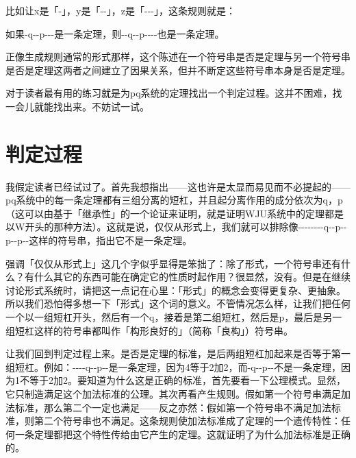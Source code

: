 \documentclass[
  12pt,
  twoside,
  openright,
  oldfontcommands,
]{memoir}
\begin{document}
比如让x是「-」，y是「-\/-」，z是「-\/-\/-」，这条规则就是：

如果-q-\/-p-\/-\/-是一条定理，则-\/-q-\/-p-\/-\/-\/-也是一条定理。

正像生成规则通常的形式那样，这个陈述在一个符号串是否是定理与另一个符号串是否是定理这两者之间建立了因果关系，但并不断定这些符号串本身是否是定理。

对于读者最有用的练习就是为pq系统的定理找出一个判定过程。这并不困难，找一会儿就能找出来。不妨试一试。

\section{判定过程}

我假定读者已经试过了。首先我想指出------这也许是太显而易见而不必提起的------pq系统中的每一条定理都有三组分离的短杠，并且起分离作用的成分依次为q，p（这可以由基于「继承性」的一个论证来证明，就是证明WJU系统中的定理都是以W开头的那种方法）。这就是说，仅仅从形式上，我们就可以排除像-\/-\/-\/-\/-\/-\/-\/-q-\/-p-\/-p-\/-p-\/-这样的符号串，指出它不是一条定理。

强调「仅仅从形式上」这几个字似乎显得是笨拙了：除了形式，一个符号串还有什么？有什么其它的东西可能在确定它的性质时起作用？很显然，没有。但是在继续讨论形式系统时，请把这一点记在心里：「形式」的概念会变得更复杂、更抽象。所以我们恐怕得多想一下「形式」这个词的意义。不管情况怎么样，让我们把任何一个以一组短杠开头，然后有一个q，接着是第二组短杠，然后是p，最后是另一组短杠这样的符号串都叫作「构形良好的」（简称「良构」）符号串。

让我们回到判定过程上来。是否是定理的标准，是后两组短杠加起来是否等于第一组短杠。例如：-\/-\/-\/-q-\/-p-\/-是一条定理，因为4等于2加2，而-q-\/-p-\/-不是一条定理，因为1不等于2加2。要知道为什么这是正确的标准，首先要看一下公理模式。显然，它只制造满足这个加法标准的公理。其次再看产生规则。假如第一个符号串满足加法标准，那么第二个一定也满足------反之亦然：假如第一个符号串不满足加法标准，则第二个符号串也不满足。这条规则使加法标准成了定理的一个遗传特性：任何一条定理都把这个特性传给由它产生的定理。这就证明了为什么加法标准是正确的。
\end{document}
